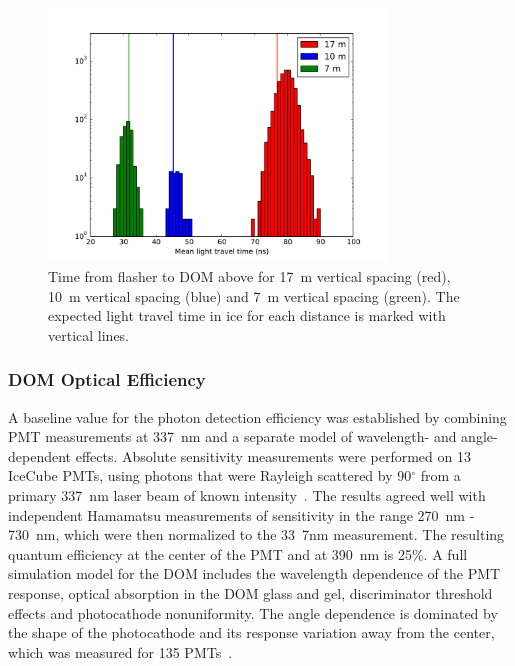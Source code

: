 \begin{figure}[!h]
  \captionsetup[subfigure]{labelformat=empty}
  \centering
  \includegraphics[width=0.8\textwidth]{graphics/dom/rapcal/flashmean.pdf}
  \caption{Time from flasher to DOM above for 17~m vertical spacing
    (red), 10~m vertical spacing (blue) and 7~m vertical spacing
    (green). The expected light travel time in ice for each distance is marked with
    vertical lines.}
  \label{fig:flashertiming}
\end{figure}

\subsubsection{\label{sec:domeff} DOM Optical Efficiency}

A baseline value for the photon detection efficiency was established
by combining PMT measurements at 337~nm and a separate model of
wavelength- and angle-dependent effects.  Absolute sensitivity
measurements were performed on 13 IceCube PMTs, using photons that
were Rayleigh scattered by 90$^{\circ}$  from a primary 337~nm laser
beam of known intensity~\cite{ICECUBE:PMT}. The results agreed well
with independent Hamamatsu measurements of sensitivity in the range
270~nm - 730~nm, which were then normalized to the 33~7nm measurement.  The resulting quantum efficiency at the center of the PMT and at 390~nm is 25\%.  A full simulation model for the DOM includes the wavelength dependence of the PMT response, optical absorption in the DOM glass and gel, discriminator threshold effects and photocathode nonuniformity.   The angle dependence is dominated by the shape of the photocathode and its response variation away from the center, which was measured for 135 PMTs~\cite{ICECUBE:PMT}.   

